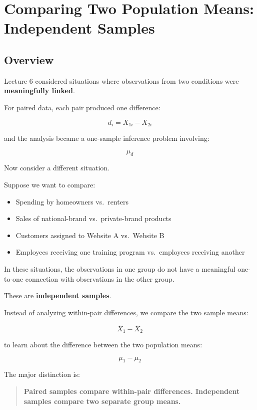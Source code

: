 \documentclass[
  letterpaper,
  DIV=11,
  numbers=noendperiod]{scrreprt}
\providecommand{\tightlist}{%
  \setlength{\itemsep}{0pt}\setlength{\parskip}{0pt}}
\begin{document}

\chapter{Comparing Two Population Means: Independent
Samples}\label{comparing-two-population-means-independent-samples}

\section{Overview}\label{overview-6}

Lecture 6 considered situations where observations from two conditions
were \textbf{meaningfully linked}.

For paired data, each pair produced one difference:

\[
d_i=X_{1i}-X_{2i}
\]

and the analysis became a one-sample inference problem involving:

\[
\mu_d
\]

Now consider a different situation.

Suppose we want to compare:

\begin{itemize}
\tightlist
\item
  Spending by homeowners vs.~renters
\item
  Sales of national-brand vs.~private-brand products
\item
  Customers assigned to Website A vs.~Website B
\item
  Employees receiving one training program vs.~employees receiving
  another
\end{itemize}

In these situations, the observations in one group do not have a
meaningful one-to-one connection with observations in the other group.

These are \textbf{independent samples}.

Instead of analyzing within-pair differences, we compare the two sample
means:

\[
\bar{X}_1-\bar{X}_2
\]

to learn about the difference between the two population means:

\[
\boxed{\mu_1-\mu_2}
\]

The major distinction is:

\begin{quote}
\textbf{Paired samples compare within-pair differences. Independent
samples compare two separate group means.}
\end{quote}
\end{document}
